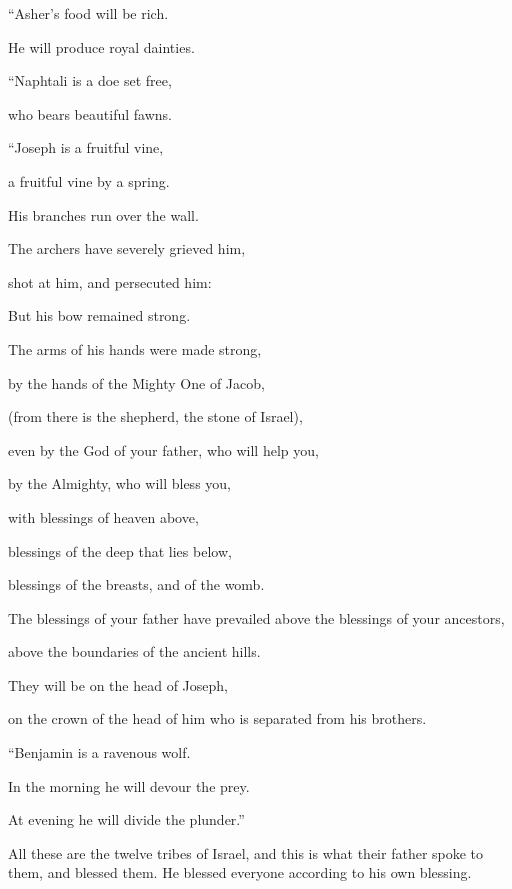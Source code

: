 {\par }{\BB \par }{\Q {}“Asher’s food will be rich.
\par }{\QB He will produce royal dainties.
\par }{\BB \par }{\Q {}“Naphtali is a doe set free,
\par }{\QB who bears beautiful fawns.
\par }{\BB \par }{\Q {}“Joseph is a fruitful vine,
\par }{\QB a fruitful vine by a spring.
\par }{\QB His branches run over the wall.
\par }{\Q {}The archers have severely grieved him,
\par }{\QB shot at him, and persecuted him:
\par }{\Q {}But his bow remained strong.
\par }{\QB The arms of his hands were made strong,
\par }{\QB by the hands of the Mighty One of Jacob,
\par }{\QB (from there is the shepherd, the stone of Israel),
\par }{\Q {}even by the God of your father, who will help you,
\par }{\QB by the Almighty, who will bless you,
\par }{\Q with blessings of heaven above,
\par }{\QB blessings of the deep that lies below,
\par }{\QB blessings of the breasts, and of the womb.
\par }{\Q {}The blessings of your father have prevailed above the blessings of your ancestors,
\par }{\QB above the boundaries of the ancient hills.
\par }{\Q They will be on the head of Joseph,
\par }{\QB on the crown of the head of him who is separated from his brothers.
\par }{\BB \par }{\Q {}“Benjamin is a ravenous wolf.
\par }{\QB In the morning he will devour the prey.
\par }{\QB At evening he will divide the plunder.”
\par }{\PP {}All these are the twelve tribes of Israel, and this is what their father spoke to them, and blessed them. He blessed everyone according to his own blessing.
}
